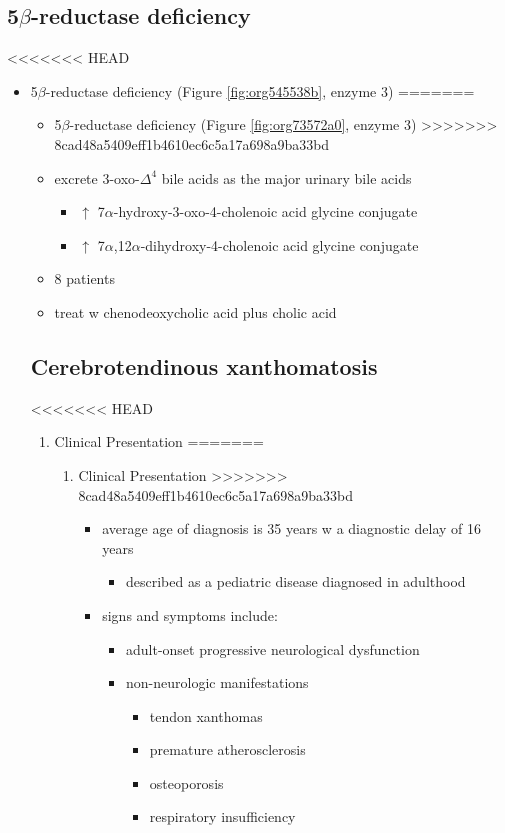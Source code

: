 \documentclass{scrartcl}
\begin{document}
\begin{itemize}
\begin{enumerate}
\begin{enumerate}
\begin{enumerate}
\subsection{5\(\beta\)-reductase deficiency}
<<<<<<< HEAD
\label{sec:orge1c47f0}
\begin{itemize}
\item 5\(\beta\)-reductase deficiency (Figure \ref{fig:org545538b}, enzyme 3)
=======
\label{sec:org7dee5d7}
\begin{itemize}
\item 5\(\beta\)-reductase deficiency (Figure \ref{fig:org73572a0}, enzyme 3)
>>>>>>> 8cad48a5409eff1b4610ec6c5a17a698a9ba33bd
\item excrete 3-oxo-\(\Delta^{\text{4}}\) bile acids as the major urinary bile acids
\begin{itemize}
\item \(\uparrow\) 7\(\alpha\)-hydroxy-3-oxo-4-cholenoic acid glycine conjugate
\item \(\uparrow\) 7\(\alpha\),12\(\alpha\)-dihydroxy-4-cholenoic acid glycine conjugate
\end{itemize}
\item 8 patients
\item treat w chenodeoxycholic acid plus cholic acid
\end{itemize}
\subsection{Cerebrotendinous xanthomatosis}
<<<<<<< HEAD
\label{sec:orgc47784b}
\begin{enumerate}
\item Clinical Presentation
\label{sec:orgea1363e}
=======
\label{sec:orge452773}
\begin{enumerate}
\item Clinical Presentation
\label{sec:org4bebbc2}
>>>>>>> 8cad48a5409eff1b4610ec6c5a17a698a9ba33bd
\begin{itemize}
\item average age of diagnosis is 35 years w a diagnostic delay of 16 years
\begin{itemize}
\item described as a pediatric disease diagnosed in adulthood
\end{itemize}
\item signs and symptoms include:
\begin{itemize}
\item adult-onset progressive neurological dysfunction
\item non-neurologic manifestations
\begin{itemize}
\item tendon xanthomas
\item premature atherosclerosis
\item osteoporosis
\item respiratory insufficiency
\end{itemize}
\end{itemize}
\end{itemize}


\end{enumerate}
\end{enumerate}
\end{itemize}
\end{enumerate}
\end{enumerate}
\end{enumerate}
\end{itemize}
\end{document}
